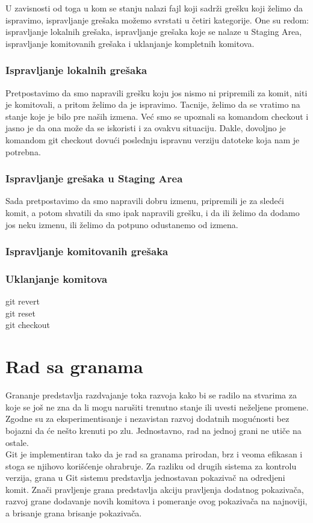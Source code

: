 \documentclass[a4paper]{article}
\begin{document}
{U zavisnosti od toga u kom se stanju nalazi fajl koji sadrži grešku koji želimo da ispravimo, ispravljanje grešaka možemo svrstati u četiri kategorije. One su redom: ispravljanje lokalnih grešaka, ispravljanje grešaka koje se nalaze u Staging Area, ispravljanje komitovanih grešaka i uklanjanje kompletnih komitova.

\subsubsection*{Ispravljanje lokalnih grešaka}
\label{lokalne_greske}
Pretpostavimo da smo napravili grešku koju jos nismo ni pripremili za komit, niti je komitovali, a pritom želimo da je ispravimo. Tacnije, želimo da se vratimo na stanje koje je bilo pre naših izmena. Već smo se upoznali sa komandom checkout i jasno je da ona može da se iskoristi i za ovakvu situaciju. Dakle, dovoljno je komandom git checkout dovući poslednju ispravnu verziju datoteke koja nam je potrebna.

\subsubsection*{Ispravljanje grešaka u Staging Area}
\label{staging_greske}

Sada pretpostavimo da smo napravili dobru izmenu, pripremili je za sledeći komit, a potom shvatili da smo ipak napravili grešku, i da ili želimo da dodamo jos neku izmenu, ili želimo da potpuno odustanemo od izmena.
\subsubsection*{Ispravljanje komitovanih grešaka}
\label{komitovane_greske}
\subsubsection*{Uklanjanje komitova}
\label{uklanjanje_komitova}
git revert \\
git reset \\
git checkout \\

\section{Rad sa granama}
\label{sec:grane}
Grananje predstavlja razdvajanje toka razvoja kako bi se radilo na stvarima za koje se još ne zna da li mogu narušiti trenutno stanje ili uvesti neželjene promene. Zgodne su za eksperimentisanje i nezavistan razvoj dodatnih mogućnosti bez bojazni da će nešto krenuti po zlu. Jednostavno, rad na jednoj grani ne utiče na ostale.\\
Git je implementiran tako da je rad sa granama prirodan, brz i veoma efikasan i stoga se njihovo korišćenje ohrabruje. Za razliku od drugih sistema za kontrolu verzija, grana u Git sistemu predstavlja jednostavan pokazivač na odredjeni komit. Znači pravljenje grana predstavlja akciju pravljenja dodatnog pokazivača, razvoj grane dodavanje novih komitova i pomeranje ovog pokazivača na najnoviji, a brisanje grana brisanje pokazivača.

}
\end{document}
